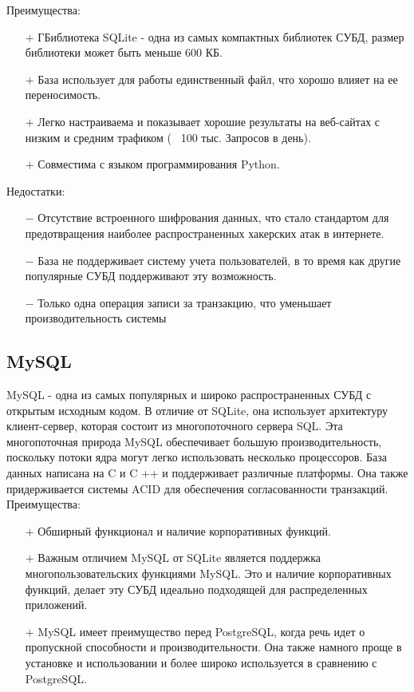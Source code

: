 \documentclass[12pt,a4paper,oneside]{report}
\begin{document}
Преимущества:
\begin{itemize}
	\item[$+$] ГБиблиотека SQLite - одна из самых компактных библиотек СУБД, размер библиотеки может быть меньше 600 КБ.
	\item[$+$] База использует для работы единственный файл, что хорошо влияет на ее переносимость.
	\item[$+$] Легко настраиваема и показывает хорошие результаты на веб-сайтах с низким и средним трафиком (~ 100 тыс. Запросов в день). 
	\item[$+$] Совместима с языком программирования Python.
\end{itemize}

Недостатки:
\begin{itemize}
	\item[$-$] Отсутствие встроенного шифрования данных, что стало стандартом для предотвращения наиболее распространенных хакерских атак в интернете.
	\item[$-$] База не поддерживает систему учета пользователей, в то время как другие популярные СУБД поддерживают эту возможность.
	\item[$-$] Только одна операция записи за транзакцию, что уменьшает производительность системы
\end{itemize}

\subsection{MySQL}
\quad MySQL - одна из самых популярных и широко распространенных СУБД с открытым исходным кодом. В отличие от SQLite, она использует архитектуру клиент-сервер, которая состоит из многопоточного сервера SQL. Эта многопоточная природа MySQL обеспечивает большую производительность, поскольку потоки ядра могут легко использовать несколько процессоров. База данных написана на C и C ++ и поддерживает различные платформы. Она также придерживается системы ACID для обеспечения согласованности транзакций. \cite{sqlite}\\

Преимущества:
\begin{itemize}
	\item[$+$] Обширный функционал и наличие корпоративных функций.
	\item[$+$] Важным отличием MySQL от SQLite является поддержка многопользовательских функциями MySQL. Это и наличие корпоративных функций, делает эту СУБД идеально подходящей для распределенных приложений.
	\item[$+$] MySQL имеет преимущество перед PostgreSQL, когда речь идет о пропускной способности и производительности. Она также намного проще в установке и использовании и более широко используется в сравнению с PostgreSQL.
\end{itemize}
\end{document}
